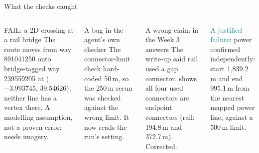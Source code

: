 \documentclass[aspectratio=169,11pt]{beamer}
\newcommand{\tl}[1]{\texttt{\detokenize{#1}}}
\begin{document}
\begin{frame}{What the checks caught}
\small
\begin{columns}[T,onlytextwidth]
\begin{block}{\textcolor{failred}{FAIL}: a 2D crossing at a rail bridge}
The route moves from way 891041250 onto bridge-tagged way 239559205 at ($-3.993745$, $39.54626$); neither line has a vertex there. A modelling assumption, not a proven error: needs imagery.
\end{block}
\begin{block}{A bug in the agent's own checker}
The connector-limit check hard-coded 50\,m, so the 250\,m rerun was checked against the wrong limit. It now reads the run's setting.
\end{block}
\begin{block}{A wrong claim in the Week 3 answers}
The write-up said rail used a gap connector. \tl{connectors.gpkg} shows all four used connectors are endpoint connectors (rail: 194.8\,m and 372.7\,m). Corrected.
\end{block}
\begin{block}{\textcolor{teal}{A justified failure}: power}
\tl{endpoint_too_far} confirmed independently: start 1{,}839.2\,m and end 995.1\,m from the nearest mapped power line, against a 500\,m limit.
\end{block}
\end{columns}
\end{frame}
\end{document}
